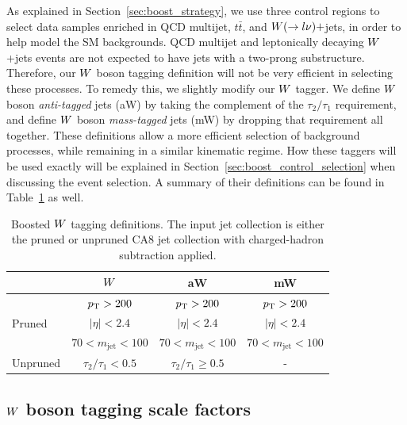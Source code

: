 As explained in Section~\ref{sec:boost_strategy}, we use three control regions to select data
samples enriched in QCD multijet, $t\bar{t}$, and $W(\rightarrow l \nu)+$jets, in order to help
model the SM backgrounds. QCD multijet and leptonically decaying $W$+jets events are not expected
to have jets with a two-prong substructure. Therefore, our $W$ boson tagging definition will not be
very efficient in selecting these processes. To remedy this, we slightly modify our $W$ tagger. 
We define $W$ boson \textit{anti-tagged} jets (aW) by taking the complement of the $\tau_2 /
\tau_1$ requirement, and define $W$ boson \textit{mass-tagged} jets (mW) by dropping that
requirement all together. 
These definitions allow a more efficient selection of background processes, while remaining in a
similar kinematic regime. How these taggers will be used exactly will be explained in
Section~\ref{sec:boost_control_selection} when discussing the event selection. A summary of their
definitions can be found in Table~\ref{tab:Wtag_definition} as well. 

\begin{table}[htdp]
\caption{Boosted $W$ tagging definitions. The input jet collection is either the pruned or unpruned
CA8 jet collection with charged-hadron subtraction applied. }
\vspace{1ex}
\centering
\begin{tabular}{l c c c}
\toprule
& $W$ & aW & mW  \\
\midrule
\multirow{3}{*}{Pruned} & $p_{\mathrm{T}} > 200$  & $p_{\mathrm{T}} > 200$  & $p_{\mathrm{T}} > 200$\\
& $|\eta| < 2.4$ & $|\eta| < 2.4$ & $|\eta| < 2.4$\\
& $70 < m_{\textrm{jet}}< 100$ & $70 < m_{\textrm{jet}}< 100$ & $70 < m_{\textrm{jet}}< 100$\\
\midrule
Unpruned & $\tau_2 / \tau_1 < 0.5$ & $\tau_2 / \tau_1 \geq 0.5$ & -\\
\bottomrule
\end{tabular}
\label{tab:Wtag_definition}
\end{table}


\subsection{\texorpdfstring{$W$}{W} boson tagging scale factors \label{sec:wtag_scale_factor}}

